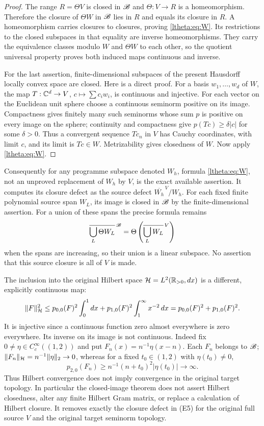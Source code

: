 \begin{proof}
The range $R=\Theta V$ is closed in $\mathscr B$ and $\Theta:V\to R$ is a
homeomorphism. Therefore the closure of $\Theta W$ in $\mathscr B$ lies in
$R$ and equals its closure in $R$. A homeomorphism carries closures
to closures, proving \eqref{ltheta:eq:W}. Its restrictions to the closed
subspaces in that equality are inverse homeomorphisms. They carry
the equivalence classes modulo $W$ and $\Theta W$ to each other,
so the quotient universal property proves both induced maps
continuous and inverse.

For the last assertion, finite-dimensional subspaces of the present
Hausdorff locally convex space are closed. Here is a direct proof.
For a basis $w_1,\ldots,w_d$ of $W$, the map
$T:\mathbb C^d\to V$, $c\mapsto\sum c_iw_i$, is continuous and injective.
For each vector on the Euclidean unit sphere choose a continuous
seminorm positive on its image. Compactness gives finitely many
such seminorms whose sum $p$ is positive on every image on the
sphere; continuity and compactness give $p(Tc)\geq\delta|c|$ for
some $\delta>0$. Thus a convergent sequence $Tc_n$ in $V$ has
Cauchy coordinates, with limit $c$, and its limit is $Tc\in W$.
Metrizability gives closedness of $W$. Now apply \eqref{ltheta:eq:W}.
\end{proof}

Consequently for any programme subspace denoted $W_h$, formula
\eqref{ltheta:eq:W}, not an unproved replacement of $W_h$ by $V$, is the
exact available assertion. It computes its closure defect as the
source defect $\overline{W_h}^{\,V}/W_h$. For each fixed finite
polynomial source span $W_L$, its image is closed in $\mathscr B$ by the
finite-dimensional assertion. For a union of these spans the precise
formula remains
\[
 \overline{\bigcup_L\Theta W_L}^{\,\mathscr B}
    =\Theta\left(\overline{\bigcup_L W_L}^{\,V}\right)
\]
when the spans are increasing, so their union is a linear subspace.
No assertion that this source closure is all of $V$ is made.

The inclusion into the original Hilbert space
$\mathcal H=L^2(\mathbb R_{>0},dx)$ is a different, explicitly continuous map:
\begin{equation}\label{ltheta:eq:Hilbert}
 \|F\|_{\mathcal H}^2
 \leq p_{0,0}(F)^2\int_0^1dx
          +p_{1,0}(F)^2\int_1^\infty x^{-2}\,dx
 =p_{0,0}(F)^2+p_{1,0}(F)^2.
\end{equation}
It is injective since a continuous function zero almost everywhere
is zero everywhere. Its inverse on its image is not continuous.
Indeed fix $0\ne\eta\in C_c^\infty((1,2))$ and put
$F_n(x)=n^{-1}\eta(x-n)$. Each $F_n$ belongs to $\mathscr B$;
$\|F_n\|_{\mathcal H}=n^{-1}\|\eta\|_2\to0$, whereas for a fixed
$t_0\in(1,2)$ with $\eta(t_0)\ne0$,
\[
 p_{2,0}(F_n)\geq n^{-1}(n+t_0)^2|\eta(t_0)|\longrightarrow\infty.
\]
Thus Hilbert convergence does not imply convergence in the original
target topology. In particular the closed-image theorem does not
assert Hilbert closedness, alter any finite Hilbert Gram matrix, or
replace a calculation of Hilbert closure. It removes exactly the
closure defect in (E5) for the original full source $V$ and the
original target seminorm topology.


